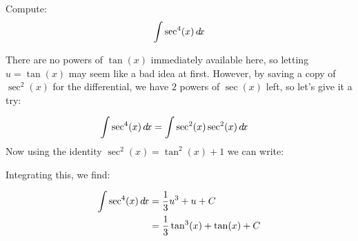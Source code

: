 \documentclass{ximera}
\begin{document}
\begin{example}
Compute: 
\[
\int \sec^{4}(x) \mathop{}\!d\! x 
\]
\begin{explanation}
 There are no powers of $\tan(x)$ immediately available here, so letting $u=\tan(x)$ may seem like a bad idea at first.  However, by saving a copy of $\sec^2(x)$ for the differential, we have $2$ powers of $\sec(x)$ left, so let's give it a try:
 
    \begin{align*}
    \int \sec^{4}(x) \mathop{}\!d\! x  &= \int \sec^2(x) \sec^2(x) \mathop{}\!d\! x
    \end{align*}
    Now using the identity $\sec^{2}(x)=\tan^{2}(x)+1$ we can write:
    \begin{center}%
    \end{center}
   
   Integrating this, we find:
   
   \begin{align*}
   \int \sec^{4}(x) \mathop{}\!d\! x  &= \frac{1}{3}u^3+u +C\\
   &= \frac{1}{3} \tan^3(x)+\tan(x)+C
   \end{align*}
\end{explanation}
\end{example} 
\end{document}
